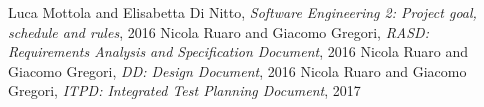 	Luca Mottola and Elisabetta Di Nitto, \emph{Software Engineering 2: Project goal, schedule and rules}, 2016
	Nicola Ruaro and Giacomo Gregori, \emph{RASD: Requirements Analysis and Specification Document}, 2016	
	Nicola Ruaro and Giacomo Gregori, \emph{DD: Design Document}, 2016	
	Nicola Ruaro and Giacomo Gregori, \emph{ITPD: Integrated Test Planning Document}, 2017	